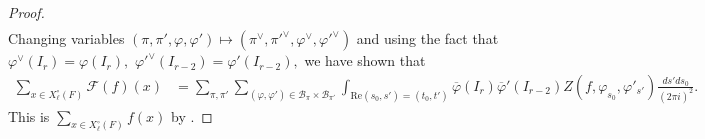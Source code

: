 \documentclass[12pt]{amsart}
\theoremstyle{remark}
\numberwithin{equation}{section}
\theoremstyle{definition}
\numberwithin{equation}{subsection}
\begin{document}
\begin{proof}
\begin{align*}
\end{align*}
Changing variables $(\pi,\pi',\varphi,\varphi') \mapsto (\pi^\vee,\pi'^\vee,\varphi^\vee,\varphi'^\vee)$ and using the fact that $\varphi^\vee(I_r)=\varphi(I_r),$ $\varphi'^\vee(I_{r-2})=\varphi'(I_{r-2}),$ we have shown that 
\begin{align*}
\sum_{x \in X_\ell^\circ(F)}\mathcal{F}(f)(x)
&=\sum_{\pi,\pi'}\sum_{(\varphi,\varphi') \in \mathcal{B}_{\pi} \times \mathcal{B}_{\pi'}}\int_{\mathrm{Re}(s_0,s')=(t_0,t')}\overline{\varphi}(I_r)\overline{\varphi}'(I_{r-2}) Z(f,\varphi_{s_0},\varphi'_{s'})\frac{ds'ds_0}{(2\pi i)^2}.
\end{align*}
This is 
$    \sum_{x \in X^\circ_{\ell}(F)}f\left(x\right) $ by  .
\end{proof}


{}

\printindex
\end{document}
